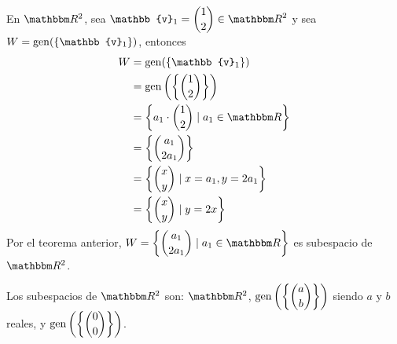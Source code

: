 \begin{example}
    En $\RR[2]$, sea $\displaystyle \mathbb{v}_1 = \binom{1}{2} \in \RR[2]$ y sea $W = \Gen (\{ \mathbb{v}_1 \})$, entonces
    \begin{align*}
        W & = \Gen (\{ \mathbb{v}_1 \}) \\
        & = \Gen \left(\left\{ \binom{1}{2} \right\}\right) \\
        & = \left\{ a_1 \cdot \binom{1}{2} \mid a_1 \in \RR \right\} \\
        & = \left\{ \binom{a_1}{2a_1} \right\} \\
        & = \left\{ \binom{x}{y} \mid x = a_1,  y = 2a_1 \right\} \\
        & = \left\{ \binom{x}{y} \mid y = 2x \right\}
    \end{align*}
    Por el teorema anterior, $\displaystyle W = \left\{ \binom{a_1}{2a_1} \mid a_1 \in \RR \right\}$ es subespacio de $\RR[2]$.
\end{example}

\begin{observation}
    Los subespacios de $\RR[2]$ son: $\RR[2]$, $\displaystyle \operatorname{gen} \left(\left\{ \binom{a}{b} \right\}\right)$ siendo $a$ y $b$ reales, y $\displaystyle \operatorname{gen} \left(\left\{ \binom{0}{0} \right\}\right)$.
\end{observation}


